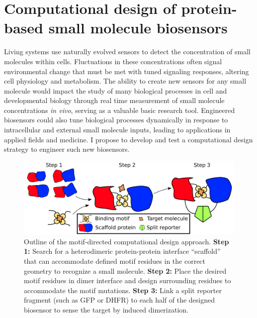 \newcommand{\acarbon}{$\alpha$-carbon}
\newcommand{\acarbons}{$\alpha$-carbons}
\newcommand{\invitro}{\textit{in vitro}}
\newcommand{\invivo}{\textit{in vivo}}
\newcommand{\ecoli}{\textit{E. coli}}

\chapter{Computational design of protein-based small molecule biosensors}


Living systems use naturally evolved sensors to detect the concentration of small molecules within cells.
Fluctuations in these concentrations often signal environmental change that must be met with tuned signaling responses, altering cell physiology and metabolism.
The ability to create new sensors for any small molecule would impact the study of many biological processes in cell and developmental biology through real time measurement of small molecule concentrations \invivo, serving as a valuable basic research tool.
Engineered biosensors could also tune biological processes dynamically in response to intracellular and external small molecule inputs, leading to applications in applied fields and medicine.
I propose to develop and test a computational design strategy to engineer such new biosensors.

\begin{figure}[H]
  \centering
  \includegraphics[width=\textwidth,keepaspectratio]{figures/biosensor-fig1-crop.pdf}
  \caption[Outline of the motif-directed computational design approach]{
    Outline of the motif-directed computational design approach.
    \textbf{Step 1:} Search for a heterodimeric protein-protein interface ``scaffold'' that can accommodate defined motif residues in the correct geometry to recognize a small molecule.
    \textbf{Step 2:} Place the desired motif residues in dimer interface and design surrounding residues to accommodate the motif mutations.
    \textbf{Step 3:} Link a split reporter fragment (such as GFP or DHFR) to each half of the designed biosensor to sense the target by induced dimerization.
  }
  \label{fig:schematic-outline}
\end{figure}

